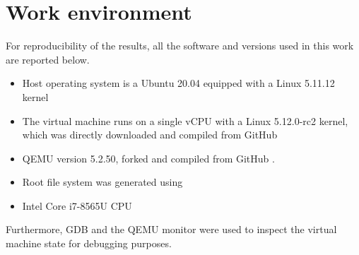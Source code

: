 \section{Work environment}
For reproducibility of the results, all the software and versions used in this work are reported below.

\begin{itemize}
    \item Host operating system is a Ubuntu 20.04 equipped with a Linux 5.11.12 kernel
    \item The virtual machine runs on a single vCPU with a Linux 5.12.0-rc2 kernel, which was directly downloaded and compiled from GitHub \cite{linux-rep}
    \item QEMU version 5.2.50, forked and compiled from GitHub \cite{qemu-rep}. 
    \item Root file system was generated using \cite{rootfs-rep} 
    \item Intel Core i7-8565U CPU
\end{itemize}
Furthermore, GDB and the QEMU monitor were used to inspect the virtual machine state for debugging purposes. 